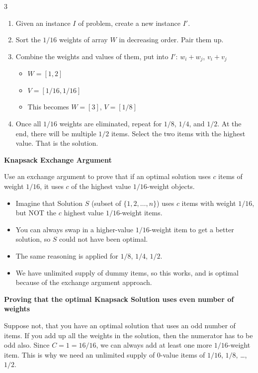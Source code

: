 \documentclass[letterpaper]{article}
\begin{document}
\begin{multicols*}{3}
    \begin{enumerate}
        \item Given an instance $I$ of problem, create a new instance $I'$.
        \item Sort the $1/16$ weights of array $W$ in decreasing order. Pair them up.
        \item Combine the weights and values of them, put into $I'$: $w_i + w_j$, $v_i + v_j$
              \begin{itemize}
                  \item $W = [1, 2]$
                  \item $V = [1/16, 1/16]$
                  \item This becomes $W=[3]$, $V=[1/8]$
              \end{itemize}
        \item Once all $1/16$ weights are eliminated, repeat for $1/8$, $1/4$, and $1/2$.
              At the end, there will be multiple $1/2$ items. Select the two items with
              the highest value. That is the solution.
    \end{enumerate}

    \textbf{Knapsack Exchange Argument}

    Use an exchange argument to prove that if an optimal solution uses $c$ items of weight $1/16$, it uses $c$ of the highest value $1/16$-weight objects.

    \begin{itemize}
        \item Imagine that Solution $S$ (subset of $\{1, 2, \ldots, n\}$) uses $c$ items with weight $1/16$,
              but NOT the $c$ highest value $1/16$-weight items.
        \item You can always swap in a higher-value $1/16$-weight item to get a better solution, so $S$ could not have
              been optimal.
        \item The same reasoning is applied for $1/8$, $1/4$, $1/2$.
        \item We have unlimited supply of dummy items, so this works, and is optimal because of
              the exchange argument approach.
    \end{itemize}

    \textbf{Proving that the optimal Knapsack Solution uses even number of weights}

    Suppose not, that you have an optimal solution that uses an odd number of items. If you add up all the weights in the solution, then the numerator has to be odd also. Since $C = 1 = 16/16$, we can always add at least one more $1/16$-weight item. This is why we need an unlimited supply of $0$-value items of $1/16$, $1/8$, \ldots, $1/2$.



\end{multicols*}
\end{document}

